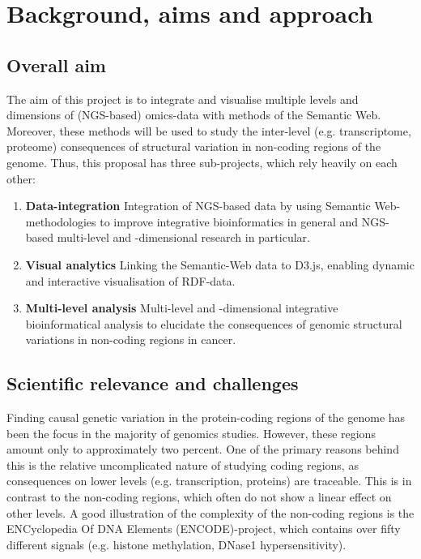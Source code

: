 \documentclass[twoside,fontsize=10pt]{article}
\begin{document}
\section*{Background, aims and approach}
\subsection*{Overall aim}
The aim of this project is to integrate and visualise multiple levels and dimensions of (NGS-based) omics-data with methods of the Semantic Web. Moreover, these methods will be used to study the inter-level (e.g. transcriptome, proteome) consequences of structural variation in non-coding regions of the genome. Thus, this proposal has three sub-projects, which rely heavily on each other:

\begin{enumerate}
\item \textbf{Data-integration} 
Integration of NGS-based data by using Semantic Web-methodologies to improve integrative bioinformatics in general and NGS-based multi-level and -dimensional research in particular.
\item \textbf{Visual analytics} 
Linking the Semantic-Web data to D3.js, enabling dynamic and interactive visualisation of RDF-data.
\item \textbf{Multi-level analysis} 
Multi-level and -dimensional integrative bioinformatical analysis to elucidate the consequences of genomic structural variations in non-coding regions in cancer.
\end{enumerate}
\subsection*{Scientific relevance and challenges} 
Finding causal genetic variation in the protein-coding regions of the genome has been the focus in the majority of genomics studies. However, these regions amount only to approximately two percent\cite{Lander2001}. One of the primary reasons behind this is the relative uncomplicated nature of studying coding regions, as consequences on lower levels (e.g. transcription, proteins) are traceable\cite{McLaren2010}. This is in contrast to the non-coding regions, which often do not show a linear effect on other levels\cite{Bird2006}. A good illustration of the complexity of the non-coding regions is the ENCyclopedia Of DNA Elements (ENCODE)-project\cite{ENCODE}, which contains over fifty different signals (e.g. histone methylation, DNase1 hypersensitivity). 
\end{document}
